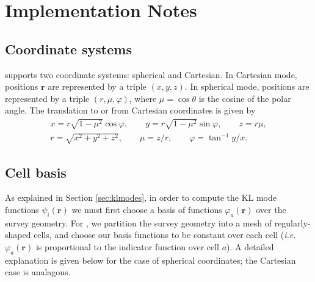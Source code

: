 \documentclass{article}
\newcommand{\opsec}{\protect{\textrm{OPSEC}}\xspace}
\newcommand{\ie}{\textit{i.e.}}
\renewcommand{\vec}[1]{\bm{#1}}
\renewcommand{\r}{\vec{r}}
\renewcommand{\phi}{\varphi}
\begin{document}
\section{Implementation Notes}
\label{sec:implementation}


\subsection{Coordinate systems}

\opsec supports two coordinate systems: spherical and Cartesian.  In Cartesian
mode, positions $\r$ are represented by a triple $(x,y,z)$.  In spherical mode,
positions are represented by a triple $(r,\mu,\phi)$, where $\mu = \cos\theta$
is the cosine of the polar angle.  The translation to or from Cartesian
coordinates is given by
\begin{gather}
    x = r \sqrt{1-\mu^2} \cos\phi, \qquad y = r \sqrt{1-\mu^2} \sin\phi, \qquad z = r \mu, \\
    r = \sqrt{x^2+y^2+z^2}, \qquad \mu = z/r, \qquad \phi = \tan^{-1} y/x.
\end{gather}


\subsection{Cell basis}
\label{sec:cells}

As explained in Section \ref{sec:klmodes}, in order to compute the KL mode
functions $\psi_i(\r)$ we must first choose a basis of functions $\phi_a(\r)$
over the survey geometry.  For \opsec, we partition the survey geometry into a
mesh of regularly-shaped cells, and choose our basis functions to be constant
over each cell (\ie~$\phi_a(\r)$ is proportional to the indicator function over
cell $a$).  A detailed explanation is given below for the case of spherical
coordinates; the Cartesian case is analagous.
\end{document}
